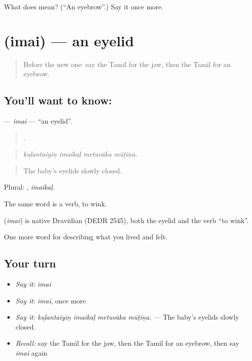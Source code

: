 \begin{tcolorbox}[breakable,colback=teal!4,colframe=teal!35!black,title={Before you move on}]
What does  mean? (\textquotedblleft{}An eyebrow\textquotedblright{}.) Say it once more.
\end{tcolorbox}
\section[\texorpdfstring{\ta{இமை} (imai)}{இமை (imai)}]{ (imai) — an eyelid}

\label{lesson:TA-C480-imai}



\begin{quote}
Before the new one: say the Tamil for the jaw, then the Tamil for an eyebrow.
\end{quote}

\subsection*{You'll want to know: }
\textbf{} — \emph{imai} — \textquotedblleft{}an eyelid\textquotedblright{}.

\begin{quote}
   .
\end{quote}

\begin{quote}
\emph{kuḻantaiyiṉ imaikaḷ metuvāka mūṭiṉa.}
\end{quote}

\begin{quote}
The baby’s eyelids slowly closed.
\end{quote}

Plural: , \emph{imaikaḷ}.

The same word is a verb, to wink.

\begin{cousinweb}
\textbf{} (\emph{imai}) is native Dravidian (DEDR 2545), both the eyelid and the verb \textquotedblleft{}to wink\textquotedblright{}.
\end{cousinweb}

\begin{grammarlens}[title={What you've built}]
One more word for describing what you lived and felt.
\end{grammarlens}

\subsection*{Your turn}
\begin{itemize}
\raggedright
  \item \emph{Say it:} \emph{imai}
  \item \emph{Say it:} \emph{imai}, once more
  \item \emph{Say it:} \emph{kuḻantaiyiṉ imaikaḷ metuvāka mūṭiṉa.} — The baby’s eyelids slowly closed.
  \item \emph{Recall:} say the Tamil for the jaw, then the Tamil for an eyebrow, then say \emph{imai} again
\end{itemize}

